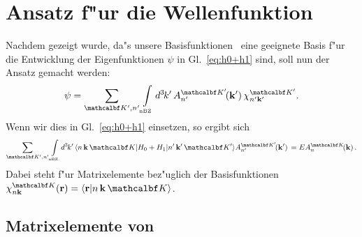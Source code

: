 \section{Ansatz f"ur die Wellenfunktion}
\label{sec:ansatz}

Nachdem gezeigt wurde, da"s unsere Basisfunktionen \basis\ eine geeignete
Basis f"ur die Entwicklung der Eigenfunktionen 
$\psi$ in Gl.~\eqref{eq:h0+h1} sind, soll nun der Ansatz gemacht werden:
%
\begin{displaymath}
  \psi = \sum_{\pri{\set},\pri{n}} \bzint{nBZ} \vdx{\pri{\nkb}} \pkoeff
  \pbasis .
\end{displaymath}
%
Wenn wir dies in Gl.~\eqref{eq:h0+h1} einsetzen, so ergibt sich
%
\begin{equation}
  \label{eq:pre-SG}
  \sum_{\pri{\set},\pri{n}} \bzint{nBZ} \vdx{\pri{\nkb}}
  \matrixel{\varbasis}{\op{H_{0}}+\op{H_{1}}}{\pvarbasis} \pkoeff = E \koeff .
\end{equation}
%
Dabei steht  f"ur
Matrixelemente bez"uglich der Basisfunktionen $\basis(\vec{r}) =
\braket{\vec{r}}{\varbasis}$. 

\subsection{Matrixelemente von }
\label{sec:h0}

